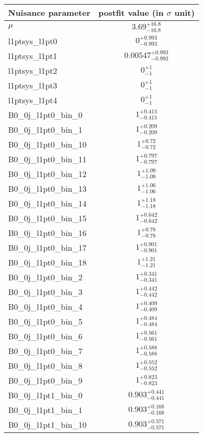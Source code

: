 
\begin{tabular}{|l|c|}
\hline
Nuisance parameter & postfit value (in $\sigma$ unit) \\\hline
$\mu$ & $3.69^{+16.8}_{-16.8}$ \\
l1ptsys\_l1pt0 & $0^{+0.993}_{-0.993}$ \\
l1ptsys\_l1pt1 & $0.00547^{+0.993}_{-0.993}$ \\
l1ptsys\_l1pt2 & $0^{+1}_{-1}$ \\
l1ptsys\_l1pt3 & $0^{+1}_{-1}$ \\
l1ptsys\_l1pt4 & $0^{+1}_{-1}$ \\
B0\_0j\_l1pt0\_bin\_0 & $1^{+0.415}_{-0.415}$ \\
B0\_0j\_l1pt0\_bin\_1 & $1^{+0.209}_{-0.209}$ \\
B0\_0j\_l1pt0\_bin\_10 & $1^{+0.72}_{-0.72}$ \\
B0\_0j\_l1pt0\_bin\_11 & $1^{+0.797}_{-0.797}$ \\
B0\_0j\_l1pt0\_bin\_12 & $1^{+1.09}_{-1.09}$ \\
B0\_0j\_l1pt0\_bin\_13 & $1^{+1.06}_{-1.06}$ \\
B0\_0j\_l1pt0\_bin\_14 & $1^{+1.18}_{-1.18}$ \\
B0\_0j\_l1pt0\_bin\_15 & $1^{+0.642}_{-0.642}$ \\
B0\_0j\_l1pt0\_bin\_16 & $1^{+0.78}_{-0.78}$ \\
B0\_0j\_l1pt0\_bin\_17 & $1^{+0.901}_{-0.901}$ \\
B0\_0j\_l1pt0\_bin\_18 & $1^{+1.21}_{-1.21}$ \\
B0\_0j\_l1pt0\_bin\_2 & $1^{+0.341}_{-0.341}$ \\
B0\_0j\_l1pt0\_bin\_3 & $1^{+0.442}_{-0.442}$ \\
B0\_0j\_l1pt0\_bin\_4 & $1^{+0.409}_{-0.409}$ \\
B0\_0j\_l1pt0\_bin\_5 & $1^{+0.484}_{-0.484}$ \\
B0\_0j\_l1pt0\_bin\_6 & $1^{+0.561}_{-0.561}$ \\
B0\_0j\_l1pt0\_bin\_7 & $1^{+0.588}_{-0.588}$ \\
B0\_0j\_l1pt0\_bin\_8 & $1^{+0.552}_{-0.552}$ \\
B0\_0j\_l1pt0\_bin\_9 & $1^{+0.823}_{-0.823}$ \\
B0\_0j\_l1pt1\_bin\_0 & $0.903^{+0.441}_{-0.441}$ \\
B0\_0j\_l1pt1\_bin\_1 & $0.903^{+0.168}_{-0.168}$ \\
B0\_0j\_l1pt1\_bin\_10 & $0.903^{+0.571}_{-0.571}$ \\

\end{tabular}
